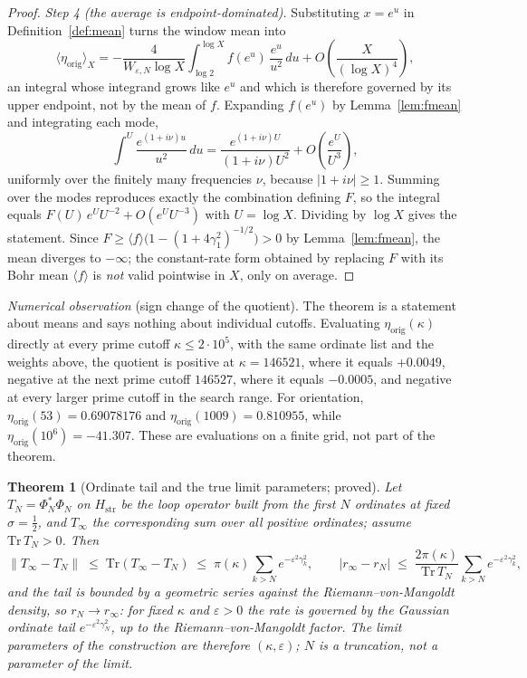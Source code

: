 \documentclass[11pt]{article}
\newtheorem{theorem}{Theorem}[section]
\newcommand{\Hstr}{H_{\mathrm{str}}}
\newcommand{\WeN}{W_{\varepsilon,N}}
\begin{document}
\begin{proof}
\textit{Step 4 (the average is endpoint-dominated).} Substituting $x=e^u$ in
Definition~\ref{def:mean} turns the window mean into
\[
\langle\eta_{\mathrm{orig}}\rangle_X
=-\frac{4}{\WeN\log X}\int_{\log 2}^{\log X}f(e^u)\,\frac{e^u}{u^2}\,du
+O\!\left(\frac{X}{(\log X)^4}\right),
\]
an integral whose integrand grows like $e^u$ and which is therefore governed
by its upper endpoint, not by the mean of $f$. Expanding $f(e^u)$ by
Lemma~\ref{lem:fmean} and integrating each mode,
\[
\int^{U}\frac{e^{(1+i\nu)u}}{u^{2}}\,du
=\frac{e^{(1+i\nu)U}}{(1+i\nu)U^{2}}
+O\!\left(\frac{e^{U}}{U^{3}}\right),
\]
uniformly over the finitely many frequencies $\nu$, because
$|1+i\nu|\ge1$. Summing over the modes reproduces exactly the combination
defining $F$, so the integral equals $F(U)\,e^{U}U^{-2}+O(e^UU^{-3})$ with
$U=\log X$. Dividing by $\log X$ gives the statement. Since
$F\ge\langle f\rangle\bigl(1-(1+4\gamma_1^2)^{-1/2}\bigr)>0$ by
Lemma~\ref{lem:fmean}, the mean diverges to
$-\infty$; the constant-rate form obtained by replacing $F$ with its Bohr
mean $\langle f\rangle$ is \emph{not} valid pointwise in $X$, only on
average.
\end{proof}

\emph{Numerical observation} (sign change of the quotient). The theorem is a
statement about means and says nothing about individual cutoffs. Evaluating
$\eta_{\mathrm{orig}}(\kappa)$ directly at every prime cutoff
$\kappa\le 2\cdot10^{5}$, with the same ordinate list and the weights above,
the quotient is positive at $\kappa=146521$, where it equals $+0.0049$,
negative at the next prime cutoff $146527$, where it equals $-0.0005$, and
negative at every larger prime cutoff in the search range. For orientation,
$\eta_{\mathrm{orig}}(53)=0.69078176$ and
$\eta_{\mathrm{orig}}(1009)=0.810955$, while
$\eta_{\mathrm{orig}}(10^{6})=-41.307$. These are evaluations on a finite
grid, not part of the theorem.

\begin{theorem}[Ordinate tail and the true limit parameters; proved]
\label{thm:sat}
Let $T_N=\Phi_N^{*}\Phi_N$ on $\Hstr$ be the loop operator built from the
first $N$ ordinates at fixed $\sigma=\tfrac12$, and $T_\infty$ the
corresponding sum over all positive ordinates; assume
$\mathrm{Tr}\,T_N>0$. Then
\[
\|T_\infty-T_N\|\;\le\;\mathrm{Tr}(T_\infty-T_N)\;\le\;
\pi(\kappa)\sum_{k>N}e^{-\varepsilon^2\gamma_k^2},
\qquad
|r_\infty-r_N|\;\le\;\frac{2\pi(\kappa)}{\mathrm{Tr}\,T_N}
\sum_{k>N}e^{-\varepsilon^2\gamma_k^2},
\]
and the tail is bounded by a geometric series against the
Riemann--von-Mangoldt density, so $r_N\to r_\infty$: for fixed $\kappa$ and $\varepsilon>0$ the rate is
governed by the Gaussian ordinate tail $e^{-\varepsilon^2\gamma_N^2}$, up to
the Riemann--von-Mangoldt factor. The limit parameters of the construction are therefore
$(\kappa,\varepsilon)$; $N$ is a truncation, not a parameter of the limit.
\end{theorem}
\end{document}
